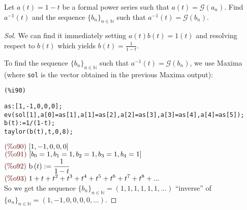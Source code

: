 \begin{exercise}
  Let $a(t) = 1-t$ be a formal power series such that $a(t) =
  \mathcal{G} (a_n)$. Find $a^{-1}(t)$ and the sequence
  $\{b_n\}_{n\in\mathbb{N} } $ such that $a^{-1}(t) = \mathcal{G}(b_n)
  $.
\end{exercise}
\begin{proof}[Sol]
  We can find it immediately setting $a(t)b(t)=1(t)$ and resolving
  respect to $b(t)$ which yields $b(t) = \frac{1}{1-t} $.

  To find the sequence $\{b_n\}_{n\in\mathbb{N} } $ such that
  $a^{-1}(t) = \mathcal{G}(b_n) $, we use Maxima (where
  \texttt{\color{blue}sol} is the vector obtained in the previous
  Maxima output):\\
\noindent
\begin{minipage}[t]{8ex}{\color{red}\bf
\begin{verbatim}
(%i90) 
\end{verbatim}}
\end{minipage}
\begin{minipage}[t]{\textwidth}{\color{blue}
\begin{verbatim}
as:[1,-1,0,0,0];
ev(sol[1],a[0]=as[1],a[1]=as[2],a[2]=as[3],a[3]=as[4],a[4]=as[5]);
b(t):=1/(1-t);
taylor(b(t),t,0,8);
\end{verbatim}}
\end{minipage}
\begin{math}\displaystyle
\parbox{8ex}{\color{labelcolor}(\%o90) }
[1,-1,0,0,0]
\end{math}\\
\begin{math}\displaystyle
\parbox{8ex}{\color{labelcolor}(\%o91) }
[{b}_{0}=1,{b}_{1}=1,{b}_{2}=1,{b}_{3}=1,{b}_{4}=1]
\end{math}\\
\begin{math}\displaystyle
\parbox{8ex}{\color{labelcolor}(\%o92) }
\mathrm{b}\left( t\right) :=\frac{1}{1-t}
\end{math}\\
\begin{math}\displaystyle
\parbox{8ex}{\color{labelcolor}(\%o93) }
1+t+{t}^{2}+{t}^{3}+{t}^{4}+{t}^{5}+{t}^{6}+{t}^{7}+{t}^{8}+...
\end{math}\\
So we get the sequence $\{b_n\}_{n\in\mathbb{N} }
=(1,1,1,1,1,1,\ldots)$ ``inverse'' of $\{a_n\}_{n\in\mathbb{N} }
=(1,-1,0,0,0,0,\ldots)$.
\end{proof}